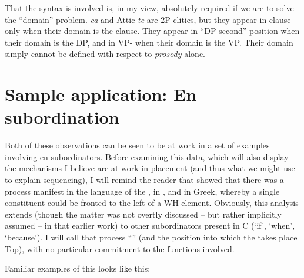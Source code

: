 \documentclass[output=paper,
modfonts
]{LSP/langsci}
\begin{document}
That the syntax is involved is, in my view, absolutely required if we are to solve
the ``domain'' problem.  \textit{ca} and Attic \textit{te} are 2P clitics, but they appear
in clause- only when their domain is the clause. They appear in ``DP-second'' position
when their domain is the DP, and in VP- when their domain is the VP. Their domain
simply cannot be defined with respect to \textit{prosody} alone.

\section{Sample application: En subordination}
Both of these observations can be seen to be at work in a set of examples involving
en subordinators. Before examining this data, which will also display the mechanisms I believe
are at work in  placement (and thus what we might use to explain  sequencing), I will
remind the reader that \citet{hale1987} showed that there was a process manifest in the language of
the , in , and in Greek, whereby a single constituent could be fronted to the left
of a WH-element. Obviously, this analysis extends (though the matter was not overtly discussed -- but rather
implicitly assumed -- in
that earlier work) to other subordinators present in C (`if', `when', `because'). I will call that 
process ``'' (and the position into which the  takes place Top), with no
particular commitment to the  functions involved.

Familiar examples of this  looks like this:

\end{document}
